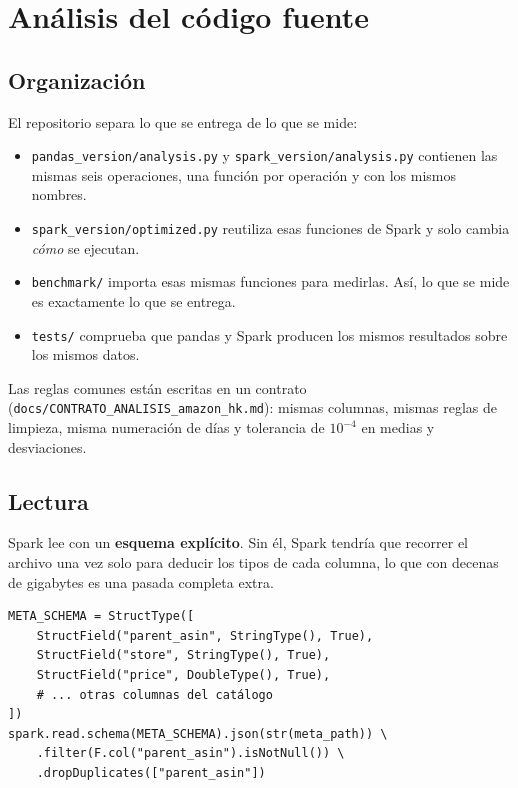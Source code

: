\documentclass[11pt,a4paper]{article}
\begin{document}
\section{Análisis del código fuente}

\subsection{Organización}

El repositorio separa lo que se entrega de lo que se mide:

\begin{itemize}
  \item \texttt{pandas\_version/analysis.py} y \texttt{spark\_version/analysis.py} contienen
  las mismas seis operaciones, una función por operación y con los mismos nombres.
  \item \texttt{spark\_version/optimized.py} reutiliza esas funciones de Spark y solo
  cambia \emph{cómo} se ejecutan.
  \item \texttt{benchmark/} importa esas mismas funciones para medirlas. Así, lo que se mide
  es exactamente lo que se entrega.
  \item \texttt{tests/} comprueba que pandas y Spark producen los mismos resultados sobre los
  mismos datos.
\end{itemize}

Las reglas comunes están escritas en un contrato (\texttt{docs/CONTRATO\_ANALISIS\_amazon\_hk.md}):
mismas columnas, mismas reglas de limpieza, misma numeración de días y tolerancia de
$10^{-4}$ en medias y desviaciones.

\subsection{Lectura}

Spark lee con un \textbf{esquema explícito}. Sin él, Spark tendría que recorrer el archivo
una vez solo para deducir los tipos de cada columna, lo que con decenas de gigabytes es una
pasada completa extra.

\begin{lstlisting}[caption={Esquema explícito del catálogo en Spark.}]
META_SCHEMA = StructType([
    StructField("parent_asin", StringType(), True),
    StructField("store", StringType(), True),
    StructField("price", DoubleType(), True),
    # ... otras columnas del catálogo
])
spark.read.schema(META_SCHEMA).json(str(meta_path)) \
    .filter(F.col("parent_asin").isNotNull()) \
    .dropDuplicates(["parent_asin"])
\end{lstlisting}
\end{document}
